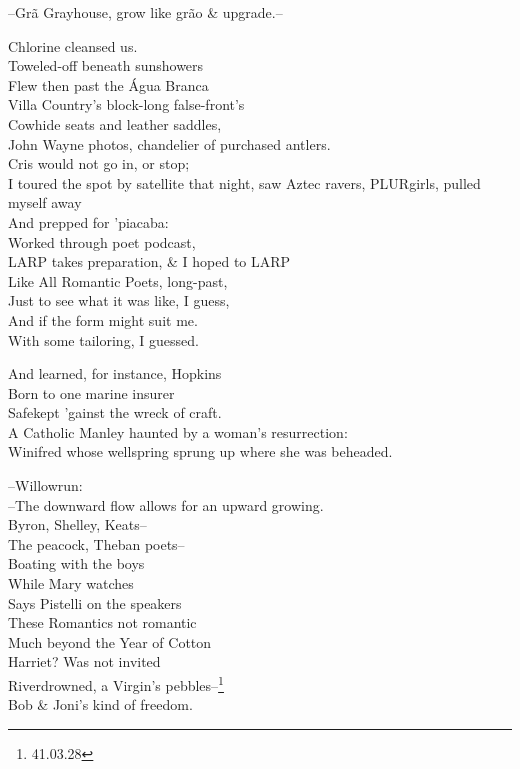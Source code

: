 --Grã Grayhouse, grow like grão \& upgrade.--

Chlorine cleansed us. \\
Toweled-off beneath sunshowers \\
Flew then past the Água Branca \\
Villa Country's block-long false-front's \\
Cowhide seats and leather saddles, \\
John Wayne photos, chandelier of purchased antlers. \\
Cris would not go in, or stop; \\
I toured the spot by satellite that night, saw
Aztec ravers, PLURgirls, pulled myself away \\
And prepped for 'piacaba: \\
Worked through poet podcast, \\
LARP takes preparation, \& I hoped to LARP \\
Like All Romantic Poets, long-past, \\
Just to see what it was like, I guess, \\
And if the form might suit me. \\
With some tailoring, I guessed.

And learned, for instance, Hopkins \\
Born to one marine insurer \\
Safekept 'gainst the wreck of craft. \\
A Catholic Manley haunted by a woman's resurrection: \\
Winifred whose wellspring sprung up where she was beheaded.

--Willowrun: \\
--The downward flow allows for an upward growing. \\

Byron, Shelley, Keats-- \\
The peacock, Theban poets-- \\
Boating with the boys \\
While Mary watches \\
Says Pistelli on the speakers \\
These Romantics not romantic \\
Much beyond the Year of Cotton \\
Harriet? Was not invited \\
Riverdrowned, a Virgin's pebbles--\footnote{41.03.28} \\
Bob \& Joni's kind of freedom.

